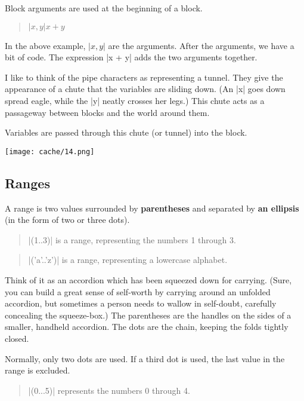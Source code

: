 \documentclass[12pt,twoside]{report}
\begin{document}
Block arguments are used at the beginning of a block.

\begin{quote}
\rubyinline${ |x,y| x + y }$\end{quote}


In the above example, \rubyinline$|x,y|$ are the
arguments.  After the arguments, we have a bit of code.  The
expression \rubyinline|x + y| adds the two arguments
together.

I like to think of the pipe characters as representing a tunnel.  They
give the appearance of a chute that the variables are sliding down.
(An \rubyinline|x| goes down spread eagle, while the
\rubyinline|y| neatly crosses her legs.)  This chute
acts as a passageway between blocks and the world around them.

Variables are passed through this chute (or tunnel) into the block.

	\texttt{[image: cache/14.png]}




\subsection{Ranges}



A range is two values surrounded by {\bf parentheses} and separated by
{\bf an ellipsis} (in the form of two or three dots).

\begin{quote}
\rubyinline|(1..3)| is a range, representing the
numbers 1 through 3.\end{quote}


\begin{quote}
\rubyinline|('a'..'z')| is a range, representing a
lowercase alphabet.\end{quote}


Think of it as an accordion which has been squeezed down for carrying.
(Sure, you can build a great sense of self-worth by carrying around an
unfolded accordion, but sometimes a person needs to wallow in
self-doubt, carefully concealing the squeeze-box.)  The parentheses
are the handles on the sides of a smaller, handheld accordion.  The
dots are the chain, keeping the folds tightly closed.

Normally, only two dots are used.  If a third dot is used, the last
value in the range is excluded.

\begin{quote}
\rubyinline|(0...5)| represents the numbers 0 through
4.\end{quote}
\end{document}
